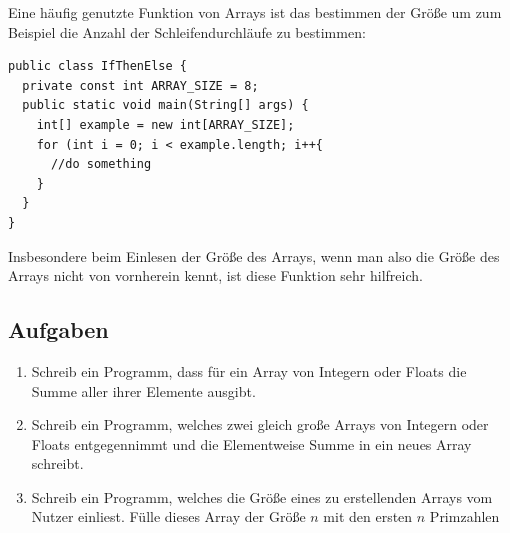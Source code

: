 Eine häufig genutzte Funktion von Arrays ist das bestimmen der Größe um zum Beispiel die Anzahl der Schleifendurchläufe zu bestimmen:

\begin{minipage}{\textwidth}
\begin{lstlisting}
public class IfThenElse {
  private const int ARRAY_SIZE = 8;
  public static void main(String[] args) {
    int[] example = new int[ARRAY_SIZE];
    for (int i = 0; i < example.length; i++{
      //do something
    }
  }
}
\end{lstlisting}	
\end{minipage}

Insbesondere beim Einlesen der Größe des Arrays, wenn man also die Größe des Arrays nicht von vornherein kennt, ist diese Funktion sehr hilfreich.

\subsection{Aufgaben}

\begin{enumerate}
	\item Schreib ein Programm, dass für ein Array von Integern oder Floats die Summe aller ihrer Elemente ausgibt.
	\item Schreib ein Programm, welches zwei gleich große Arrays von Integern oder Floats entgegennimmt und die Elementweise Summe in ein neues Array schreibt.
	\item Schreib ein Programm, welches die Größe eines zu erstellenden Arrays vom Nutzer einliest. Fülle dieses Array der Größe $n$ mit den ersten $n$ Primzahlen
\end{enumerate}

